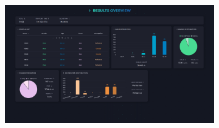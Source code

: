 \bigskip
\begin{figure}[H]
	\centering
	\begin{subfigure}[c]{0.74\textwidth}
		\centering
		\includegraphics[width=\textwidth]{imagenes/dashboard-martinc-500.png}
		\label{fig:casouso_dashboard_martinc_escritorio}
	\end{subfigure}
	\hfill
	\begin{subfigure}[c]{0.21\textwidth}
		\centering

\end{subfigure}
\end{figure}
